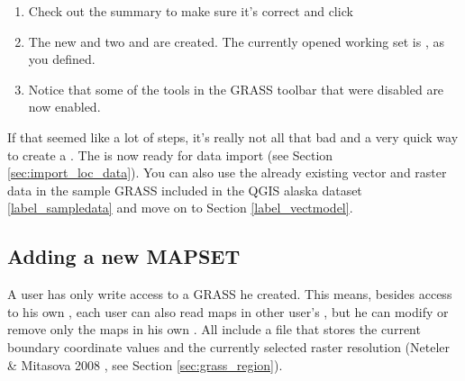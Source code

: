 \begin{enumerate}
  \footnote{When creating a new , GRASS automatically
  creates a special  called  designed to
  store the core data for the project, its default spatial extend and
  coordinate system definitions (Neteler \& Mitasova 2008
  \cite{neteler_mitasova08}).}
  \item Check out the summary to make sure it's correct and click
  \item The new  and two 
  and  are created. The currently opened working set is
  , as you defined.
  \item Notice that some of the tools in the GRASS toolbar that were
  disabled are now enabled.
\end{enumerate}

If that seemed like a lot of steps, it's really not all that bad and a very
quick way to create a . The  is
now ready for data import (see Section \ref{sec:import_loc_data}).
You can also use the already existing vector and raster data in the sample
GRASS  included in the QGIS alaska dataset
\ref{label_sampledata} and move on to Section \ref{label_vectmodel}.

\subsection{Adding a new MAPSET}\label{sec:add_mapset}

A user has only write access to a GRASS  he created. This
means, besides access to his own , each user can also read
maps in other user's , but he can modify or remove only
the maps in his own . All  include a
 file that stores the current boundary coordinate values and
the currently selected raster resolution (Neteler \& Mitasova 2008
\cite{neteler_mitasova08}, see Section \ref{sec:grass_region}).

